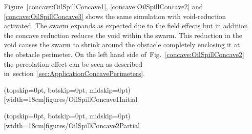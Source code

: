 \documentclass{ieeeaccess}
\begin{document}
Figure~\ref{concave:OilSpillConcave1}, \ref{concave:OilSpillConcave2} and \ref{concave:OilSpillConcave3} shows the same simulation with void-reduction activated. The swarm expands as expected due to the field effects but in addition the concave reduction reduces the void within the swarm. This reduction in the void causes the swarm to shrink around the obstacle completely enclosing it at the obstacle perimeter. On the left hand side of~Fig.~\ref{concave:OilSpillConcave2} the percolation effect can be seen as described in~section~\ref{sec:ApplicationConcavePerimeters}.

\Figure[t!](topskip=0pt, botskip=0pt, midskip=0pt)[width=18cm]{figures/OilSpillConcave1}{Initial\label{concave:OilSpillConcave1}}

\Figure[t!](topskip=0pt, botskip=0pt, midskip=0pt)[width=18cm]{figures/OilSpillConcave2}{Partial\label{concave:OilSpillConcave2}}
\end{document}

